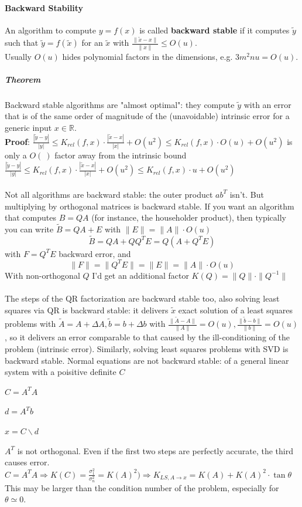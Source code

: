 \documentclass[10pt]{report}
\begin{document}
\paragraph{Backward Stability} An algorithm to compute $y=f(x)$ is called \textbf{backward stable} if it computes $\tilde{y}$ such that $\tilde{y}=f(\tilde{x})$ for an $\tilde{x}$ with $\frac{\|\tilde{x}-x\|}{\|x\|}\leq O(u)$.\\
Usually $O(u)$ hides polynomial factors in the dimensions, e.g. $3m^2nu = O(u)$.
\subparagraph{Theorem} Backward stable algorithms are "almost optimal": they compute $\tilde{y}$ with an error that is of the same order of magnitude of the (unavoidable) intrinsic error for a generic input $x\in \mathbb{R}$.\\
\textbf{Proof}: $\frac{|\tilde{y}-y|}{|y|}\leq K_{rel}(f,x)\cdot\frac{|\tilde{x}-x|}{|x|} + O(u^2)\leq K_{rel}(f,x)\cdot O(u) + O(u^2)$ is only a $O(\:)$ factor away from the intrinsic bound $\frac{|\tilde{y}-y|}{|y|}\leq K_{rel}(f,x)\cdot\frac{|\tilde{x}-x|}{|x|} + O(u^2)\leq K_{rel}(f,x)\cdot u + O(u^2)$\\\\
Not all algorithms are backward stable: the outer product $ab^T$ isn't. But multiplying by orthogonal matrices is backward stable. If you want an algorithm that computes $B=QA$ (for instance, the householder product), then typically you can write $\tilde{B} = QA + E$ with $\|E\|=\|A\|\cdot O(u)$
$$\tilde{B} = QA + QQ^TE = Q(A+Q^TE)$$ with $F = Q^TE$ backward error, and $$\|F\|=\|Q^TE\|=\|E\|=\|A\|\cdot O(u)$$
With non-orthogonal $Q$ I'd get an additional factor $K(Q) = \|Q\|\cdot\|Q^{-1}\|$\\\\
The steps of the QR factorization are backward stable too, also solving least squares via QR is backward stable: it delivers $\tilde{x}$ exact solution of a least squares problems with $\tilde{A} = A +\Delta A, \tilde{b} = b+\Delta b$ with $\frac{\|\tilde{A}-A\|}{\|A\|}=O(u),\frac{\|\tilde{b}-b\|}{\|b\|}=O(u)$, so it delivers an error comparable to that caused by the ill-conditioning of the problem (intrinsic error). Similarly, solving least squares problems with SVD is backward stable.
Normal equations are not backward stable: of a general linear system with a poisitive definite $C$ \begin{list}{}{}
	\item $C = A^TA$
	\item $d = A^Tb$
	\item $x = C \backslash d$
\end{list}
$A^T$ is not orthogonal. Even if the first two steps are perfectly accurate, the third causes error.
$C=A^TA\Rightarrow K(C) = \frac{\sigma_1^2}{\sigma_n^2} = K(A)^2) \Rightarrow K_{LS,A\rightarrow x} = K(A)+K(A)^2\cdot\tan\theta$\\
This may be larger than the condition number of the problem, especially for $\theta\simeq 0$.
\end{document}
